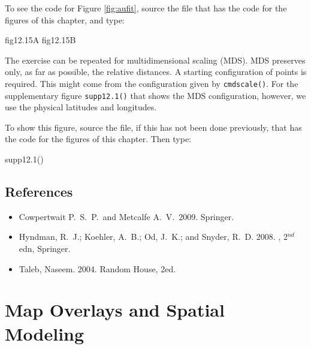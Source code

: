 \documentclass{tufte-book}\usepackage[]{graphicx}\usepackage[]{color}
\newcommand{\txtt}[1]{\texttt{#1}}
\newenvironment{itemizz}%
  {\begin{itemize} %
    \setlength{\itemsep}{2pt}%
    \setlength{\parskip}{2pt}} %
  {\end{itemize}}
\begin{document}
To see the code for Figure \ref{fig:aufit}, source the file that has the
code for the figures of this chapter, and type:
\begin{Schunk}
\begin{Sinput}
fig12.15A
fig12.15B
\end{Sinput}
\end{Schunk}

The exercise can be repeated for multidimensional scaling (MDS). MDS
preserves only, as far as possible, the relative distances.  A
starting configuration of points is required.  This might come from
the configuration given by \txtt{cmdscale()}.  For the supplementary
figure \txtt{supp12.1()} that shows the MDS configuration, however, we
use the physical latitudes and longitudes.

To show this figure, source the file, if this has not been done
previously, that has the code for the figures of this chapter. Then
type:
\begin{Schunk}
\begin{Sinput}
supp12.1()
\end{Sinput}
\end{Schunk}

\section*{References}
\begin{itemizz}
\item[] Cowpertwait P.~S.~P.\ and Metcalfe A.~V.\ 2009.
 Springer.
\item[]
Hyndman, R.~J.; Koehler, A.~B.; Od, J.~K.; and Snyder, R.~D. 2008.
, 2$^{nd}$ edn, Springer.
\item[] Taleb, Naseem. 2004.   Random House, 2ed.
\end{itemizz}
% 
\cleartooddpage

\chapter{Map Overlays  and Spatial Modeling}\label{ch:spatial}
\end{document}
